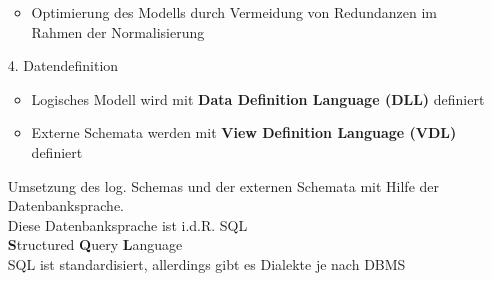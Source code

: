 \documentclass{scrreprt}
\begin{document}
\begin{itemize}
\begin{itemize}
    \item Optimierung des Modells durch Vermeidung von Redundanzen im Rahmen der Normalisierung
  \end{itemize}
  \item [4.] Datendefinition
  \begin{itemize}
    \item Logisches Modell wird mit \textbf{Data Definition Language (DLL)} definiert
    \item Externe Schemata werden mit \textbf{View Definition Language (VDL)} definiert
  \end{itemize}
    Umsetzung des log. Schemas und der externen Schemata mit Hilfe der Datenbanksprache.
  \\Diese Datenbanksprache ist i.d.R. SQL
  \\\textbf{S}tructured \textbf{Q}uery \textbf{L}anguage
  \\SQL ist standardisiert, allerdings gibt es Dialekte je nach DBMS

\end{itemize}
\end{document}

